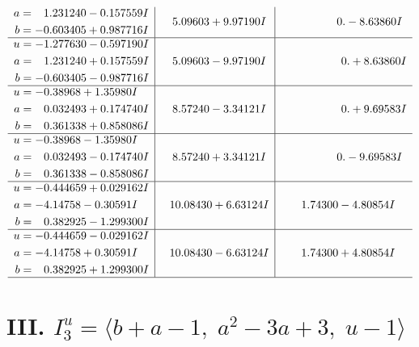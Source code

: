 \documentclass[1p]{elsarticle_modified}
\theoremstyle{definition}
\begin{document}
$$\begin{array}{c|c|c}
\begin{aligned}
a &= \phantom{-}1.231240 - 0.157559 I \\
b &= -0.603405 + 0.987716 I\end{aligned}
 & \phantom{-}5.09603 + 9.97190 I & \phantom{-0.000000 } 0. - 8.63860 I \\ \hline\begin{aligned}
u &= -1.277630 - 0.597190 I \\
a &= \phantom{-}1.231240 + 0.157559 I \\
b &= -0.603405 - 0.987716 I\end{aligned}
 & \phantom{-}5.09603 - 9.97190 I & \phantom{-0.000000 -}0. + 8.63860 I \\ \hline\begin{aligned}
u &= -0.38968 + 1.35980 I \\
a &= \phantom{-}0.032493 + 0.174740 I \\
b &= \phantom{-}0.361338 + 0.858086 I\end{aligned}
 & \phantom{-}8.57240 - 3.34121 I & \phantom{-0.000000 -}0. + 9.69583 I \\ \hline\begin{aligned}
u &= -0.38968 - 1.35980 I \\
a &= \phantom{-}0.032493 - 0.174740 I \\
b &= \phantom{-}0.361338 - 0.858086 I\end{aligned}
 & \phantom{-}8.57240 + 3.34121 I & \phantom{-0.000000 } 0. - 9.69583 I \\ \hline\begin{aligned}
u &= -0.444659 + 0.029162 I \\
a &= -4.14758 - 0.30591 I \\
b &= \phantom{-}0.382925 - 1.299300 I\end{aligned}
 & \phantom{-}10.08430 + 6.63124 I & \phantom{-}1.74300 - 4.80854 I \\ \hline\begin{aligned}
u &= -0.444659 - 0.029162 I \\
a &= -4.14758 + 0.30591 I \\
b &= \phantom{-}0.382925 + 1.299300 I\end{aligned}
 & \phantom{-}10.08430 - 6.63124 I & \phantom{-}1.74300 + 4.80854 I\\
 \hline 
 \end{array}$$\newpage\newpage\renewcommand{\arraystretch}{1}
\centering \section*{III. $I^u_{3}= \langle b+a-1,\;a^2-3 a+3,\;u-1 \rangle$}
\end{document}
